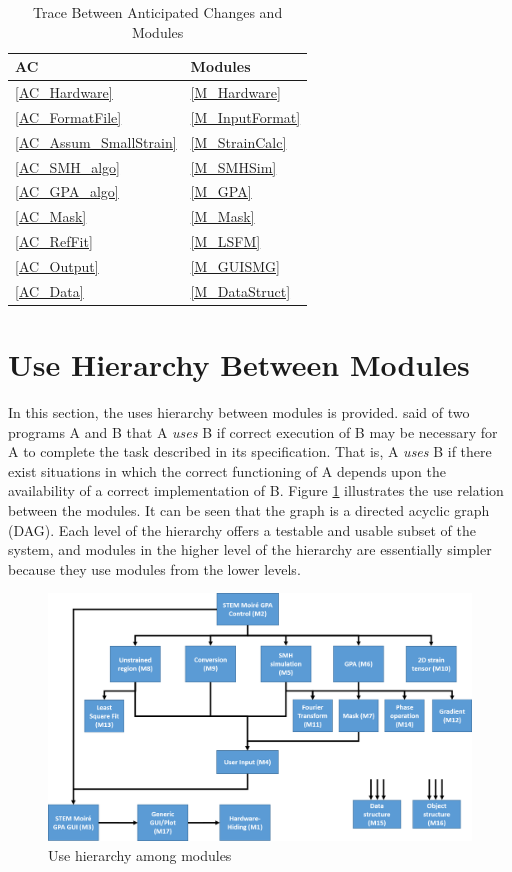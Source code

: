 \documentclass[12pt, titlepage]{article}
\begin{document}
\begin{table}[H]
\centering
\begin{tabular}{p{} p{}}
\toprule
\textbf{AC} & \textbf{Modules}\\
\midrule
\cref{AC_Hardware} & \cref{M_Hardware}\\
\cref{AC_FormatFile} & \cref{M_InputFormat}\\
\cref{AC_Assum_SmallStrain} & \cref{M_StrainCalc}\\
\cref{AC_SMH_algo} & \cref{M_SMHSim}\\
\cref{AC_GPA_algo} & \cref{M_GPA}\\
\cref{AC_Mask} & \cref{M_Mask}\\
\cref{AC_RefFit} & \cref{M_LSFM}\\
\cref{AC_Output} & \cref{M_GUISMG}\\
\cref{AC_Data} & \cref{M_DataStruct}\\
\bottomrule
\end{tabular}
\caption{Trace Between Anticipated Changes and Modules}
\label{TblACT}
\end{table}

\section{Use Hierarchy Between Modules} \label{SecUse}

In this section, the uses hierarchy between modules is
provided. \cite{Parnas1978} said of two programs A and B that A {\em uses} B if
correct execution of B may be necessary for A to complete the task described in
its specification. That is, A {\em uses} B if there exist situations in which
the correct functioning of A depends upon the availability of a correct
implementation of B.  Figure \ref{FigUH} illustrates the use relation between
the modules. It can be seen that the graph is a directed acyclic graph
(DAG). Each level of the hierarchy offers a testable and usable subset of the
system, and modules in the higher level of the hierarchy are essentially simpler
because they use modules from the lower levels.

\begin{figure}[H]
\centering
\includegraphics[width=\linewidth]{Figure_Hierarchy.png}
\caption{Use hierarchy among modules}
\label{FigUH}
\end{figure}





\end{document}
